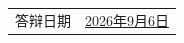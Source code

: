 \documentclass[UTF8,zihao=-4,a4paper,fontset=none]{ctexart}
\newcommand{\fangsong}{\CJKfamily{zhfs}}
\begin{document}
\vskip 15pt

\begin{center}
    \begin{tabularx}{.5\textwidth}{>{\fangsong}l >{\fangsong}X<{\centering}}
        答辩日期 & \uline{\hfill 2026年9月6日 \hfill}
    \end{tabularx}
\end{center}
\end{document}
